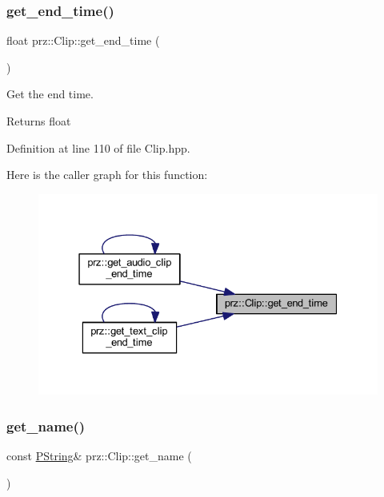 \subsubsection{\texorpdfstring{get\_end\_time()}{get\_end\_time()}}
{\footnotesize\ttfamily float prz\+::\+Clip\+::get\+\_\+end\+\_\+time (\begin{DoxyParamCaption}{ }\end{DoxyParamCaption})\hspace{0.3cm}{\ttfamily [inline]}}



Get the end time. 

\begin{DoxyReturn}{Returns}
float 
\end{DoxyReturn}


Definition at line 110 of file Clip.\+hpp.

Here is the caller graph for this function\+:
\nopagebreak
\begin{figure}[H]
\begin{center}
\leavevmode
\includegraphics[width=331pt]{classprz_1_1_clip_acfe08e188c11afa8ca32b334907fe9f9_icgraph}
\end{center}
\end{figure}
\mbox{\label{classprz_1_1_clip_accaf42d7a82d41ad70032870981f8d83}} 
\subsubsection{\texorpdfstring{get\_name()}{get\_name()}}
{\footnotesize\ttfamily const \mbox{\hyperlink{classprz_1_1_p_string}{P\+String}}\& prz\+::\+Clip\+::get\+\_\+name (\begin{DoxyParamCaption}{ }\end{DoxyParamCaption})\hspace{0.3cm}{\ttfamily [inline]}}



